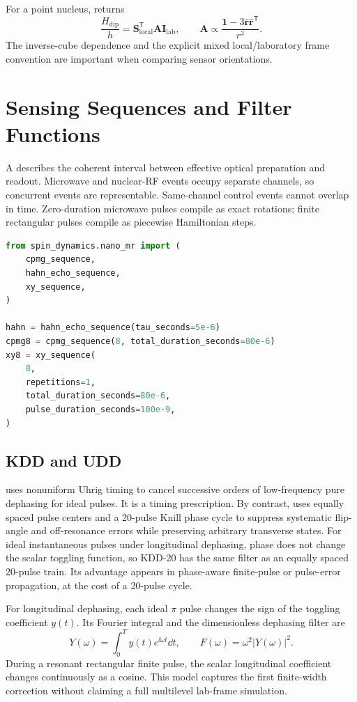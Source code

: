 For a point nucleus,  returns
\[
  \frac{H_\mathrm{dip}}{h}
  =\mathbf{S}_\mathrm{local}^{\mathsf T}\mathbf{A}
   \mathbf{I}_\mathrm{lab},\qquad
  \mathbf{A}\propto
  \frac{\mathbf{1}-3\hat{\mathbf r}\hat{\mathbf r}^{\mathsf T}}{r^3}.
\]
The inverse-cube dependence and the explicit mixed local/laboratory frame
convention are important when comparing sensor orientations.

\section{Sensing Sequences and Filter Functions}

A  describes the coherent interval between effective
optical preparation and readout. Microwave and nuclear-RF events occupy
separate channels, so concurrent events are representable. Same-channel control
events cannot overlap in time. Zero-duration microwave pulses compile as exact
rotations; finite rectangular pulses compile as piecewise Hamiltonian steps.

\begin{lstlisting}[language=Python]
from spin_dynamics.nano_mr import (
    cpmg_sequence,
    hahn_echo_sequence,
    xy_sequence,
)

hahn = hahn_echo_sequence(tau_seconds=5e-6)
cpmg8 = cpmg_sequence(8, total_duration_seconds=80e-6)
xy8 = xy_sequence(
    8,
    repetitions=1,
    total_duration_seconds=80e-6,
    pulse_duration_seconds=100e-9,
)
\end{lstlisting}

\subsection{KDD and UDD}
 uses nonuniform Uhrig timing to cancel successive
orders of low-frequency pure dephasing for ideal pulses. It is a timing
prescription. By contrast,  uses equally spaced pulse
centers and a 20-pulse Knill phase cycle to suppress systematic flip-angle and
off-resonance errors while preserving arbitrary transverse states. For ideal
instantaneous pulses under longitudinal dephasing, phase does not change the
scalar toggling function, so KDD-20 has the same filter as an equally spaced
20-pulse train. Its advantage appears in phase-aware finite-pulse or
pulse-error propagation, at the cost of a 20-pulse cycle.

For longitudinal dephasing, each ideal \(\pi\) pulse changes the sign of the
toggling coefficient \(y(t)\). Its Fourier integral and the dimensionless
dephasing filter are
\[
  Y(\omega)=\int_0^T y(t)e^{\ii\omega t}\dd t,
  \qquad
  F(\omega)=\omega^2|Y(\omega)|^2.
\]
During a resonant rectangular finite pulse, the scalar longitudinal
coefficient changes continuously as a cosine. This model captures the first
finite-width correction without claiming a full multilevel lab-frame
simulation.

